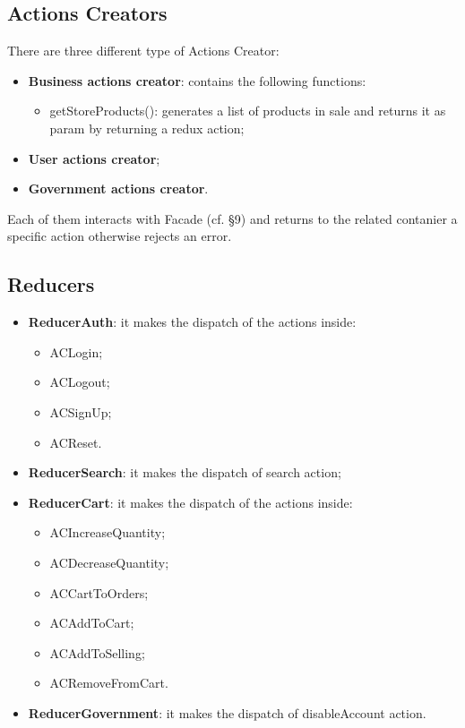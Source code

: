 \subsection{Actions Creators}
There are three different type of Actions Creator:
\begin{itemize}
	\item \textbf{Business actions creator}: contains the following functions: 
	\begin{itemize}
		\item getStoreProducts(): generates a list of products in sale and returns it as param by returning a redux action;
	\end{itemize}
	\item \textbf{User actions creator};
	\item \textbf{Government actions creator}.
\end{itemize}
Each of them interacts with Facade (cf. §9) and returns to the related contanier a specific action otherwise rejects an error.
\subsection{Reducers}
\begin{itemize}
	\item \textbf{ReducerAuth}: it makes the dispatch of the actions inside:
	\begin{itemize}
		\item ACLogin;
		\item ACLogout;
		\item ACSignUp;
		\item ACReset.
	\end{itemize}
	\item \textbf{ReducerSearch}: it makes the dispatch of search action;
	\item \textbf{ReducerCart}: it makes the dispatch of the actions inside:
	\begin{itemize}
		\item ACIncreaseQuantity;
		\item ACDecreaseQuantity;
		\item ACCartToOrders;
		\item ACAddToCart;
		\item ACAddToSelling;
		\item ACRemoveFromCart.
	\end{itemize}
	\item \textbf{ReducerGovernment}: it makes the dispatch of disableAccount action.
\end{itemize}
